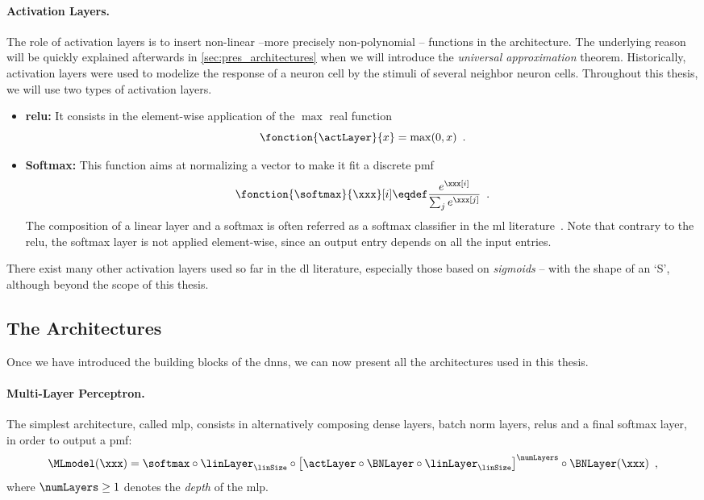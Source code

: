\paragraph{Activation Layers.}
The role of activation layers is to insert non-linear --more precisely non-polynomial -- functions in the architecture.
The underlying reason will be quickly explained afterwards in \autoref{sec:pres_architectures} when we will introduce the \emph{universal approximation} theorem.
Historically, activation layers were used to modelize the response of a neuron cell by the stimuli of several neighbor neuron cells.
Throughout this thesis, we will use two types of activation layers.
\begin{itemize}
	\item \textbf{\gls{relu}:} It consists in the element-wise application of the \(\max\) real function
	\begin{equation}
		\fonction{\actLayer}{x} = \max(0, x) \enspace .
		\label{eq:relu}
	\end{equation}
	\item \textbf{Softmax: } This function aims at normalizing a vector to make it fit a discrete \gls{pmf}
	\begin{equation}
		\fonction{\softmax}{\xxx}[i] \eqdef \frac{e^{\xxx[i]}}{\sum_{j} e^{\xxx[j]}} \enspace .
	\end{equation}
	The composition of a linear layer and a softmax is often referred as a softmax classifier in the \gls{ml} literature~\cite[Sec.~6.2.2.3]{goodfellow_deep_2017}.
	Note that contrary to the \gls{relu}, the softmax layer is not applied element-wise, since an output entry depends on all the input entries.
\end{itemize}
There exist many other activation layers used so far in the \gls{dl} literature, especially those based on \emph{sigmoids} -- \ie{} with the shape of an `S', although beyond the scope of this thesis.


\subsection{The Architectures}
\label{sec:pres_architectures}
Once we have introduced the building blocks of the \glspl{dnn}, we can now present all the architectures used in this thesis.

\paragraph{Multi-Layer Perceptron.}
The simplest architecture, called \gls{mlp}, consists in alternatively composing dense layers, batch norm layers, \glspl{relu} and a final softmax layer, in order to output a \gls{pmf}:
\begin{equation}
	\label{eq:vgg}
	\MLmodel(\xxx) = \softmax \circ \linLayer_\linSize
	\circ \left [\actLayer \circ \BNLayer \circ \linLayer_\linSize \right]^\numLayers
	\circ \BNLayer(\xxx) \enspace ,
\end{equation}
where \(\numLayers \geq 1\) denotes the \emph{depth} of the \gls{mlp}.


